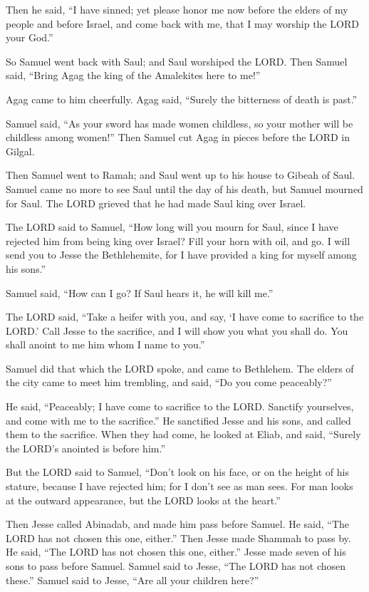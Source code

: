\myverse{}Then he said, “I have sinned; yet please honor me now before
the elders of my people and before Israel, and come back with me, that I may worship the LORD your God.”

\myverse{}So Samuel went back with Saul; and Saul worshiped the LORD.
\myverse{}Then Samuel said, “Bring Agag the king of the Amalekites here to me!”

Agag came to him cheerfully. Agag said, “Surely the bitterness of death is past.”

\myverse{}Samuel said, “As your sword has made women childless, so your
mother will be childless among women!” Then Samuel cut Agag in pieces before the LORD in Gilgal.

\myverse{}Then Samuel went to Ramah; and Saul went up to his house to
Gibeah of Saul.
\myverse{}Samuel came no more to see Saul until the day of his death, but Samuel mourned
for Saul. The LORD grieved that he had made Saul king over Israel.


\mychapter{} \myverse*{}The LORD said to Samuel, “How long will you mourn for Saul, since
I have rejected him from being king over Israel? Fill your horn with oil, and go. I will send you to Jesse
the Bethlehemite, for I have provided a king for myself among his sons.”

\myverse{}Samuel said, “How can I go? If Saul hears it, he will kill me.”

The LORD said, “Take a heifer with you, and say, ‘I have come to sacrifice to the LORD.’
\myverse{}Call Jesse to the sacrifice, and I will show you what you shall do. You shall
anoint to me him whom I name to you.”

\myverse{}Samuel did that which the LORD spoke, and came to Bethlehem. The
elders of the city came to meet him trembling, and said, “Do you come peaceably?”

\myverse{}He said, “Peaceably; I have come to sacrifice to the LORD. Sanctify
yourselves, and come with me to the sacrifice.” He sanctified Jesse and his sons, and called them to the
sacrifice.
\myverse{}When they had come, he looked at Eliab, and said, “Surely the LORD’s anointed
is before him.”

\myverse{}But the LORD said to Samuel, “Don’t look on his face, or on the
height of his stature, because I have rejected him; for I don’t see as man sees. For man looks at the
outward appearance, but the LORD looks at the heart.”

\myverse{}Then Jesse called Abinadab, and made him pass before Samuel. He
said, “The LORD has not chosen this one, either.”
\myverse{}Then Jesse made Shammah to pass by. He said, “The LORD has not chosen this
one, either.”
\myverse{}Jesse made seven of his sons to pass before Samuel. Samuel said to Jesse,
“The LORD has not chosen these.”
\myverse{}Samuel said to Jesse, “Are all your children here?”

